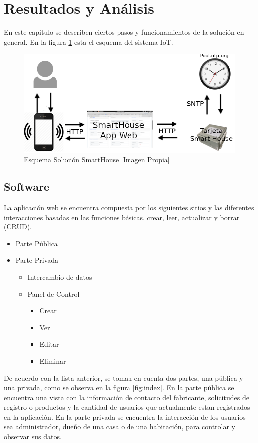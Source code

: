 \section{Resultados y Análisis}

En este capitulo se describen ciertos pasos y funcionamientos de la solución en general. En la figura \ref{fig:iot} esta el esquema del sistema IoT.\\

\begin{figure}[!t]
	\centering
	\caption{Esquema Solución SmartHouse [Imagen Propia]}
	\label{fig:iot}
	\includegraphics[width=0.8\linewidth]{Imagenes/IOT}
\end{figure}

\subsection{Software}

 La aplicación web se encuentra compuesta por los siguientes sitios y las diferentes interacciones basadas en las funciones básicas, crear, leer, actualizar y borrar (CRUD).\\

\begin{itemize}
	\item Parte Pública
	\item Parte Privada
	\begin{itemize}
		\item Intercambio de datos
		\item Panel de Control
		\begin{itemize}
			\item Crear
			\item Ver
			\item Editar
			\item Eliminar 
		\end{itemize}
	\end{itemize}
\end{itemize}

De acuerdo con la lista anterior, se toman en cuenta dos partes, una pública y una privada, como se observa en la figura \ref{fig:index}. En la parte pública se encuentra una vista con la información de contacto del fabricante, solicitudes de registro o productos y la cantidad de usuarios que actualmente estan registrados en la aplicación. En la parte privada se encuentra la interacción de los usuarios sea administrador, dueño de una casa o de una habitación, para controlar y observar sus datos.\\

